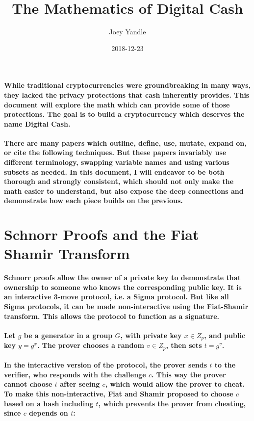 \documentclass{article}
\title{The Mathematics of Digital Cash}
\date{2018-12-23}
\author{Joey Yandle}
\begin{document}
\maketitle
\paragraph{While traditional cryptocurrencies were groundbreaking in many ways, they lacked the privacy protections that cash inherently provides.  This document will explore the math which can provide some of those protections.  The goal is to build a cryptocurrency which deserves the name Digital Cash.}

\paragraph{There are many papers which outline, define, use, mutate, expand on, or cite the following techniques.  But these papers invariably use different terminology, swapping variable names and using various subsets as needed.  In this document, I will endeavor to be both thorough and strongly consistent, which should not only make the math easier to understand, but also expose the deep connections and demonstrate how each piece builds on the previous. }
\newpage

\section{Schnorr Proofs and the Fiat Shamir Transform}

\paragraph{Schnorr proofs allow the owner of a private key to demonstrate that ownership to someone who knows the corresponding public key.  It is an interactive 3-move protocol, i.e. a Sigma protocol.  But like all Sigma protocols, it can be made non-interactive using the Fiat-Shamir transform.  This allows the protocol to function as a signature.}

\paragraph{Let $g$ be a generator in a group $G$, with private key $x \in Z_p$, and public key $y = g^x$. The prover chooses a random $v \in Z_p$, then sets $t = g^v$.}

\paragraph{In the interactive version of the protocol, the prover sends $t$ to the verifier, who responds with the challenge $c$.  This way the prover cannot choose $t$ after seeing $c$, which would allow the prover to cheat.  To make this non-interactive, Fiat and Shamir proposed to choose $c$ based on a hash including $t$, which prevents the prover from cheating, since $c$ depends on $t$:}
\end{document}
